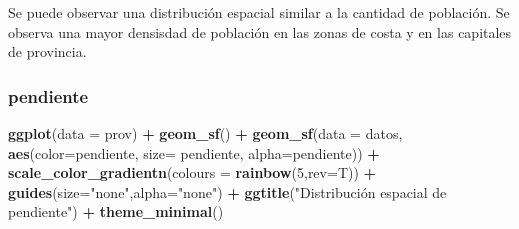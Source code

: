 \documentclass[12pt,a4paper,]{book}
\newenvironment{Shaded}{\begin{snugshade}}{\end{snugshade}}
\newcommand{\AttributeTok}[1]{\textcolor[rgb]{0.13,0.29,0.53}{#1}}
\newcommand{\CommentTok}[1]{\textcolor[rgb]{0.56,0.35,0.01}{\textit{#1}}}
\newcommand{\DecValTok}[1]{\textcolor[rgb]{0.00,0.00,0.81}{#1}}
\newcommand{\FunctionTok}[1]{\textcolor[rgb]{0.13,0.29,0.53}{\textbf{#1}}}
\newcommand{\NormalTok}[1]{#1}
\newcommand{\SpecialCharTok}[1]{\textcolor[rgb]{0.81,0.36,0.00}{\textbf{#1}}}
\newcommand{\StringTok}[1]{\textcolor[rgb]{0.31,0.60,0.02}{#1}}
\numberwithin{dummy}{section}
\theoremstyle{ocrenumbox}
\theoremstyle{blacknumex}
\theoremstyle{blacknumbox}
\theoremstyle{ocrenum}
\theoremstyle{ocrenum}
\begin{document}
\begin{Shaded}
\end{Shaded}

Se puede observar una distribución espacial similar a la cantidad de
población. Se observa una mayor densisdad de población en las zonas de
costa y en las capitales de provincia.

\hypertarget{pendiente-1}{%
\subsubsection*{pendiente}\label{pendiente-1}}

\begin{Shaded}
\begin{Highlighting}[]
\FunctionTok{ggplot}\NormalTok{(}\AttributeTok{data =}\NormalTok{ prov) }\SpecialCharTok{+} 
  \FunctionTok{geom\_sf}\NormalTok{() }\SpecialCharTok{+}
  \FunctionTok{geom\_sf}\NormalTok{(}\AttributeTok{data =}\NormalTok{ datos, }\FunctionTok{aes}\NormalTok{(}\AttributeTok{color=}\NormalTok{pendiente, }\AttributeTok{size=}\NormalTok{ pendiente, }\AttributeTok{alpha=}\NormalTok{pendiente)) }\SpecialCharTok{+}
    \FunctionTok{scale\_color\_gradientn}\NormalTok{(}\AttributeTok{colours =} \FunctionTok{rainbow}\NormalTok{(}\DecValTok{5}\NormalTok{,}\AttributeTok{rev=}\NormalTok{T)) }\SpecialCharTok{+}
  \FunctionTok{guides}\NormalTok{(}\AttributeTok{size=}\StringTok{"none"}\NormalTok{,}\AttributeTok{alpha=}\StringTok{"none"}\NormalTok{) }\SpecialCharTok{+}
  \FunctionTok{ggtitle}\NormalTok{(}\StringTok{"Distribución espacial de pendiente"}\NormalTok{) }\SpecialCharTok{+}
  \FunctionTok{theme\_minimal}\NormalTok{()}
\end{Highlighting}
\end{Shaded}
\end{document}
